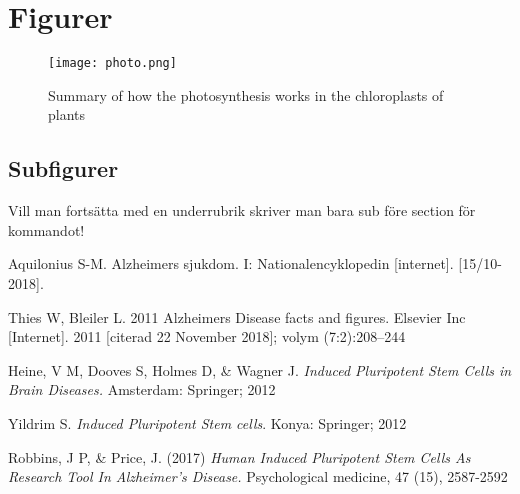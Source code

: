 \documentclass[]{article} %
\begin{document}
\section{Figurer}

\begin{figure}[H]
    \centering
    \texttt{[image: photo.png]}
    \caption{Summary of how the photosynthesis works in the chloroplasts of plants}
    \label{fig:Foto}
\end{figure}

\subsection{Subfigurer}
Vill man fortsätta med en underrubrik skriver man bara sub före section för kommandot!

\begin{figure}[H]
  \quad
\end{figure}

\newpage
\begin{thebibliography}{99}%
Aquilonius S-M. Alzheimers sjukdom. I: Nationalencyklopedin [internet]. [15/10-2018]. 

Thies W, Bleiler L. 2011 Alzheimers Disease facts and figures. Elsevier Inc [Internet]. 2011 [citerad 22 November 2018]; volym (7:2):208–244

 Heine, V M, Dooves S, Holmes D, \& Wagner J.
\emph{Induced Pluripotent Stem Cells in Brain Diseases.} Amsterdam: Springer; 2012

Yildrim S. \emph{Induced Pluripotent Stem cells}. Konya: Springer; 2012

 Robbins, J P, \& Price, J. (2017)
\emph{Human Induced Pluripotent Stem Cells As Research Tool In Alzheimer's Disease.} Psychological medicine, 47 (15), 2587-2592

\end{thebibliography} %


\printbibliography
\end{document}
